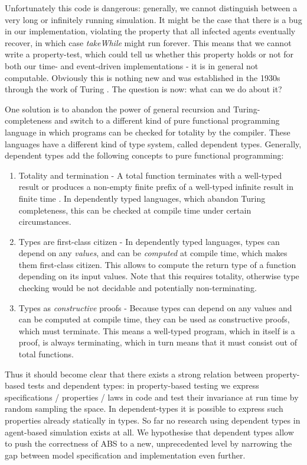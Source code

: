 Unfortunately this code is dangerous: generally, we cannot distinguish between a very long or infinitely running simulation. It might be the case that there is a bug in our implementation, violating the property that all infected agents eventually recover, in which case \textit{takeWhile} might run forever. This means that we cannot write a property-test, which could tell us whether this property holds or not for both our time- and event-driven implementations - it is in general not computable. Obviously this is nothing new and was established in the 1930s through the work of Turing \cite{turing_computable_1937}. The question is now: what can we do about it?

One solution is to abandon the power of general recursion and Turing-completeness and switch to a different kind of pure functional programming language in which programs can be checked for totality by the compiler. These languages have a different kind of type system, called dependent types. Generally, dependent types add the following concepts to pure functional programming:

\begin{enumerate}
	\item Totality and termination - A total function terminates with a well-typed result or produces a non-empty finite prefix of a well-typed infinite result in finite time \cite{brady_type-driven_2017}. In dependently typed languages, which abandon Turing completeness, this can be checked at compile time under certain circumstances.
	
	\item Types are first-class citizen - In dependently typed languages, types can depend on any \textit{values}, and can be \textit{computed} at compile time, which makes them first-class citizen. This allows to compute the return type of a function depending on its input values. Note that this requires totality, otherwise type checking would be not decidable and potentially non-terminating.
	
	\item Types as \textit{constructive} proofs - Because types can depend on any values and can be computed at compile time, they can be used as constructive proofs, which must terminate. This means a well-typed program, which in itself is a proof, is always terminating, which in turn means that it must consist out of total functions.
\end{enumerate}

Thus it should become clear that there exists a strong relation between property-based tests and dependent types: in property-based testing we express specifications / properties / laws in code and test their invariance at run time by random sampling the space. In dependent-types it is possible to express such properties already statically in types. So far no research using dependent types in agent-based simulation exists at all. We hypothesise that dependent types allow to push the correctness of ABS to a new, unprecedented level by narrowing the gap between model specification and implementation even further.


